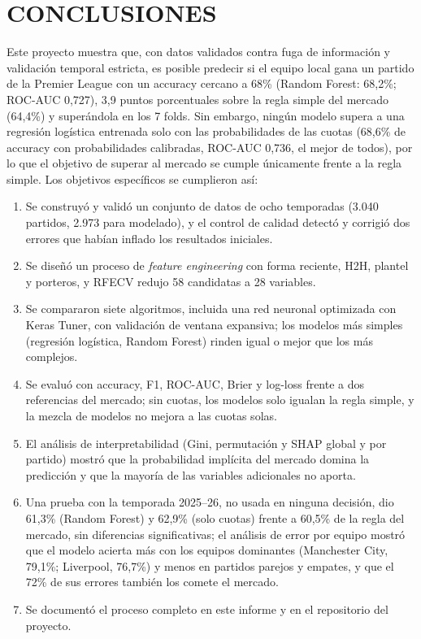 \documentclass[12pt,letterpaper,oneside]{report}
\begin{document}
\chapter{CONCLUSIONES}
\label{sec:conclusiones}
Este proyecto muestra que, con datos validados contra fuga de información y validación temporal estricta, es posible predecir si el equipo local gana un partido de la Premier League con un accuracy cercano a 68\% (Random Forest: 68,2\%; ROC-AUC 0,727), 3,9 puntos porcentuales sobre la regla simple del mercado (64,4\%) y superándola en los 7 folds. Sin embargo, ningún modelo supera a una regresión logística entrenada solo con las probabilidades de las cuotas (68,6\% de accuracy con probabilidades calibradas, ROC-AUC 0,736, el mejor de todos), por lo que el objetivo de superar al mercado se cumple únicamente frente a la regla simple. Los objetivos específicos se cumplieron así:
\begin{enumerate}
\item Se construyó y validó un conjunto de datos de ocho temporadas (3.040 partidos, 2.973 para modelado), y el control de calidad detectó y corrigió dos errores que habían inflado los resultados iniciales.
\item Se diseñó un proceso de \textit{feature engineering} con forma reciente, H2H, plantel y porteros, y RFECV redujo 58 candidatas a 28 variables.
\item Se compararon siete algoritmos, incluida una red neuronal optimizada con Keras Tuner, con validación de ventana expansiva; los modelos más simples (regresión logística, Random Forest) rinden igual o mejor que los más complejos.
\item Se evaluó con accuracy, F1, ROC-AUC, Brier y log-loss frente a dos referencias del mercado; sin cuotas, los modelos solo igualan la regla simple, y la mezcla de modelos no mejora a las cuotas solas.
\item El análisis de interpretabilidad (Gini, permutación y SHAP global y por partido) mostró que la probabilidad implícita del mercado domina la predicción y que la mayoría de las variables adicionales no aporta.
\item Una prueba con la temporada 2025--26, no usada en ninguna decisión, dio 61,3\% (Random Forest) y 62,9\% (solo cuotas) frente a 60,5\% de la regla del mercado, sin diferencias significativas; el análisis de error por equipo mostró que el modelo acierta más con los equipos dominantes (Manchester City, 79,1\%; Liverpool, 76,7\%) y menos en partidos parejos y empates, y que el 72\% de sus errores también los comete el mercado.
\item Se documentó el proceso completo en este informe y en el repositorio del proyecto.
\end{enumerate}
\end{document}
